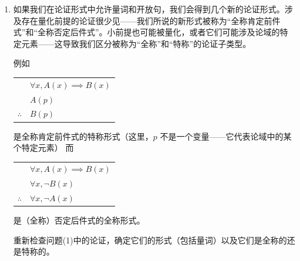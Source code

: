 \begin{enumerate}
{  \vfill
  }
  
  \workbookpagebreak
  
  \item 
  如果我们在论证形式中允许量词和开放句，我们会得到几个新的论证形式。涉及存在量化前提的论证很少见——我们所说的新形式被称为“全称肯定前件式”和“全称否定后件式”。小前提也可能被量化，或者它们可能涉及论域的特定元素——这导致我们区分被称为“全称”和“特称”的论证子类型。
  
  例如 \begin{tabular}{cl}
   & $\forall x, A(x) \implies B(x)$ \\
   & $A(p)$ \\ \hline
  $\therefore$ & $B(p)$ \\
  \end{tabular} 是全称肯定前件式的特称形式（这里，$p$ 不是一个变量——它代表论域中的某个特定元素）
  而 \begin{tabular}{cl}
   & $\forall x, A(x) \implies B(x)$ \\
   & $\forall x, {\lnot}B(x)$ \\ \hline
  $\therefore$ & $\forall x, {\lnot}A(x)$ \\
  \end{tabular} 是（全称）否定后件式的全称形式。
  
  重新检查问题(1)中的论证，确定它们的形式（包括量词）以及它们是全称的还是特称的。
  

\end{enumerate}

